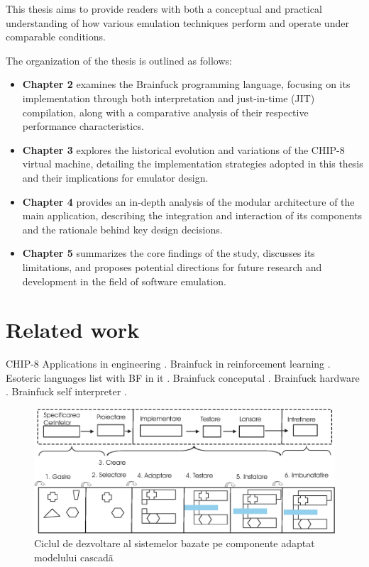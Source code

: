 \par This thesis aims to provide readers with both a conceptual and practical understanding of how various emulation techniques perform and operate under comparable conditions.

\par The organization of the thesis is outlined as follows:

\begin{itemize}
    \item \textbf{Chapter 2} examines the Brainfuck programming language, focusing on its implementation through both interpretation and just-in-time (JIT) compilation, along with a comparative analysis of their respective performance characteristics.
    \item \textbf{Chapter 3} explores the historical evolution and variations of the CHIP-8 virtual machine, detailing the implementation strategies adopted in this thesis and their implications for emulator design.
    \item \textbf{Chapter 4} provides an in-depth analysis of the modular architecture of the main application, describing the integration and interaction of its components and the rationale behind key design decisions.
    \item \textbf{Chapter 5} summarizes the core findings of the study, discusses its limitations, and proposes potential directions for future research and development in the field of software emulation.
\end{itemize}

\section{Related work}
\label{chap:ch1sec2}

\par CHIP-8 Applications in engineering \cite{Chip8Applications2019}.
Brainfuck in reinforcement learning \cite{BFReinforcementLearining2022}.
Esoteric languages list with BF in it \cite{BFEsolang2015}.
Brainfuck conceputal \cite{BFConceptual2017}.
Brainfuck hardware \cite{BFHardware2016}.
Brainfuck self interpreter \cite{BFSelfInterpreter2003}.

\begin{figure}[htbp]
	\centering
		\includegraphics[scale=0.65]{./figures/fig_3_1.eps}
	\caption{Ciclul de dezvoltare al sistemelor bazate pe componente adaptat modelului cascadã}
	\label{FigCBSD}
\end{figure}

